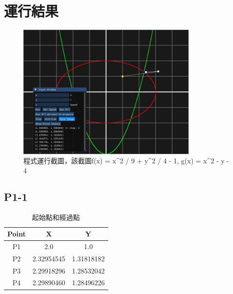 \documentclass[a4paper,12pt]{article}
\begin{document}
\section{運行結果}
\begin{figure}[H]
    \centering
    \includegraphics[width=0.8\textwidth]{img/image2.jpg}
    \caption{程式運行截圖，該截圖f(x) = x^2 / 9 + y^2 / 4 - 1, g(x) = x^2 - y - 4 }
\end{figure}

\subsection{P1-1}
\begin{table}[H]
    \centering
    \begin{tabular}{|c|c|c|}
        \hline
        Point & X & Y \\
        \hline
        P1 & 2.0 & 1.0 \\
        \hline
        P2 & 2.32954545 & 1.31818182 \\
        \hline
        P3 & 2.29918296 & 1.28532042 \\
        \hline
        P4 & 2.29890460 & 1.28496226 \\
        \hline
    \end{tabular}
    \caption{起始點和經過點}
\end{table}
\end{document}
